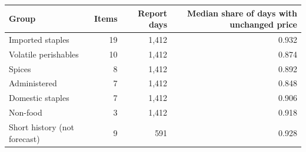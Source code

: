\begin{tabular}{lrrr}
\toprule
\textbf{Group} & \textbf{Items} & \textbf{Report days} & \textbf{Median share of days with unchanged price} \\
\midrule
Imported staples & 19 & 1,412 & 0.932 \\
Volatile perishables & 10 & 1,412 & 0.874 \\
Spices & 8 & 1,412 & 0.892 \\
Administered & 7 & 1,412 & 0.848 \\
Domestic staples & 7 & 1,412 & 0.906 \\
Non-food & 3 & 1,412 & 0.918 \\
Short history (not forecast) & 9 & 591 & 0.928 \\
\bottomrule
\end{tabular}
